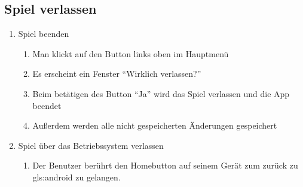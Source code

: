 \documentclass{scrartcl}
\begin{document}
\subsection{Spiel verlassen} \label{szenarien:quit_game}
\begin{enumerate}
	\item Spiel beenden
		\begin{enumerate}
			\item Man klickt auf den Button links oben im Hauptmenü
			\item Es erscheint ein Fenster \enquote{Wirklich verlassen?}
			\item Beim betätigen des Button \enquote{Ja} wird das Spiel verlassen und die App beendet
			\item Außerdem werden alle nicht gespeicherten Änderungen gespeichert
		\end{enumerate}
	\item Spiel über das Betriebssystem verlassen
		\begin{enumerate}
			\item Der Benutzer berührt den Homebutton auf seinem Gerät zum zurück zu \gls{gls:android} zu gelangen.
		\end{enumerate}
\end{enumerate}
\clearpage








\printglossary[title=Glossar]
\thispagestyle{empty}
    
\end{document}
